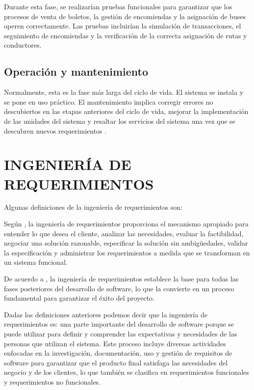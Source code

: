 		Durante esta fase, se realizarían pruebas funcionales para garantizar que los procesos de venta de boletos, la gestión de encomiendas y la asignación de buses operen correctamente. Las pruebas incluirían la simulación de transacciones, el seguimiento de encomiendas y la verificación de la correcta asignación de rutas y conductores.
	\subsection{Operación y mantenimiento}
		Normalmente, esta es la fase más larga del ciclo de vida. El sistema se instala y se pone en uso práctico. El mantenimiento implica corregir errores no descubiertos en las etapas anteriores del ciclo de vida, mejorar la implementación de las unidades del sistema y resaltar los servicios del sistema una vez que se descubren nuevos requerimientos \parencite{sommerville2011introduccion}.
	\section{INGENIERÍA DE REQUERIMIENTOS}
		
		Algunas definiciones de la ingeniería de requerimientos son:
		
		Según \textcite{pressman2010ingenieria}, la ingeniería de requerimientos proporciona el mecanismo apropiado para entender lo que desea el cliente, analizar las necesidades, evaluar la factibilidad, negociar una solución razonable, especificar la solución sin ambigüedades, validar la especificación y administrar los requerimientos a medida que se transforman en un sistema funcional.
		
		De acuerdo a \textcite{sommerville2011introduccion}, la ingeniería de requerimientos establece la base para todas las fases posteriores del desarrollo de software, lo que la convierte en un proceso fundamental para garantizar el éxito del proyecto.
		
		Dadas las definiciones anteriores podemos decir que la ingeniería de requerimientos es: una parte importante del desarrollo de software porque se puede utilizar para definir y comprender las expectativas y necesidades de las personas que utilizan el sistema. Este proceso incluye diversas actividades enfocadas en la investigación, documentación, uso y gestión de requisitos de software para garantizar que el producto final satisfaga las necesidades del negocio y de los clientes, lo que también se clasifica en requerimientos funcionales y requerimientos no funcionales.
